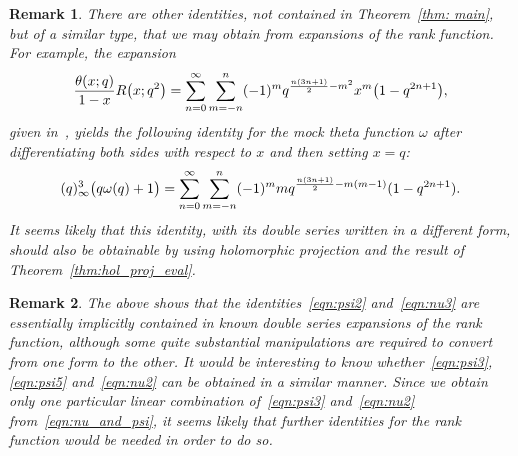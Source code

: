 \documentclass[11pt,reqno]{amsart}
\renewcommand{\=}{\;=\;}
\theoremstyle{myremark}
\newtheorem{remark}{Remark}
\begin{document}
\begin{remark}
There are other identities, not contained in Theorem~\ref{thm: main}, but of a similar type, that we may obtain from expansions of the rank function. For example, the expansion
\[ {\theta(x;q) \over 1-x} R\big(x;q^2\big) = \sum_{n=0}^\infty \sum_{m=-n}^n (-1)^m q^{{n(3n+1) \over 2}-m^2} x^m \big(1-q^{2n+1}\big), \]
given in~\cite[Equation~2.19]{Garvan2023}, yields the following identity for the mock theta function $\omega$ after differentiating both sides with respect to $x$ and then setting $x=q$:
\[ (q)_\infty^3\big(q \omega(q) + 1\big) = \sum_{n=0}^\infty \sum_{m=-n}^n (-1)^m m q^{{n(3n+1) \over 2} - m(m-1)} (1-q^{2n+1}). \]
It seems likely that this identity, with its double series written in a different form, should also be obtainable by using holomorphic projection and the result of Theorem~\ref{thm:hol_proj_eval}.
\end{remark}

\begin{remark}
The above shows that the identities~\eqref{eqn:psi2} and~\eqref{eqn:nu3} are essentially implicitly contained in known double series expansions of the rank function, although some quite substantial manipulations are required to convert from one form to the other. It would be interesting to know whether~\eqref{eqn:psi3}, \eqref{eqn:psi5} and~\eqref{eqn:nu2} can be obtained in a similar manner. Since we obtain only one particular linear combination of~\eqref{eqn:psi3} and~\eqref{eqn:nu2} from~\eqref{eqn:nu_and_psi}, it seems likely that further identities for the rank function would be needed in order to do so.
\end{remark}



\end{document}

